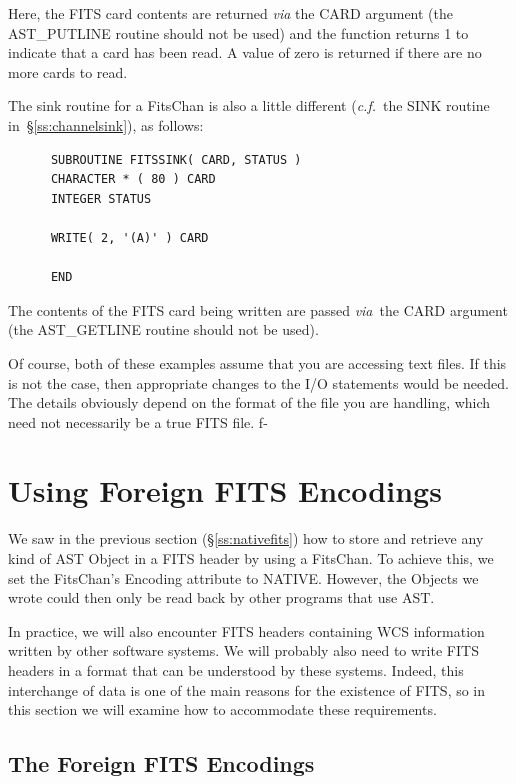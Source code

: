 \documentclass[twoside,11pt]{article}
\newcommand{\secref}[1]{\S\ref{#1}}
\newcommand{\secref}[1]{\ref{#1}}
\begin{document}
Here, the FITS card contents are returned {\em{via}} the CARD argument
(the AST\_PUTLINE routine should not be used) and the function returns
1 to indicate that a card has been read. A value of zero is returned
if there are no more cards to read.

The sink routine for a FitsChan is also a little different
({\em{c.f.}}\ the SINK routine in~\secref{ss:channelsink}), as
follows:

\small
\begin{verbatim}
      SUBROUTINE FITSSINK( CARD, STATUS )
      CHARACTER * ( 80 ) CARD
      INTEGER STATUS

      WRITE( 2, '(A)' ) CARD

      END
\end{verbatim}
\normalsize

The contents of the FITS card being written are passed {\em{via}}\ the
CARD argument (the AST\_GETLINE routine should not be used).

Of course, both of these examples assume that you are accessing text
files. If this is not the case, then appropriate changes to the I/O
statements would be needed.  The details obviously depend on the
format of the file you are handling, which need not necessarily be a
true FITS file.
f-

\cleardoublepage
\section{\label{ss:foreignfits}Using Foreign FITS Encodings}

We saw in the previous section (\secref{ss:nativefits}) how to store
and retrieve any kind of AST Object in a FITS header by using a
FitsChan. To achieve this, we set the FitsChan's Encoding attribute to
NATIVE. However, the Objects we wrote could then only be read back by
other programs that use AST.

In practice, we will also encounter FITS headers containing WCS
information written by other software systems.  We will probably also
need to write FITS headers in a format that can be understood by these
systems. Indeed, this interchange of data is one of the main reasons
for the existence of FITS, so in this section we will examine how to
accommodate these requirements.

\subsection{\label{ss:foreignencodings}The Foreign FITS Encodings}
\end{document}
